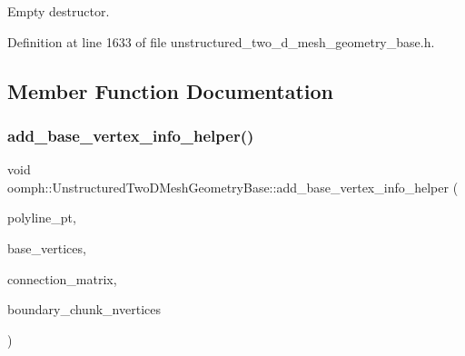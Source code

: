 Empty destructor. 



Definition at line 1633 of file unstructured\+\_\+two\+\_\+d\+\_\+mesh\+\_\+geometry\+\_\+base.\+h.



\subsection{Member Function Documentation}
\mbox{\label{classoomph_1_1UnstructuredTwoDMeshGeometryBase_af23ca325fcc70af06e9fad71fc284b29}} 
\subsubsection{\texorpdfstring{add\+\_\+base\+\_\+vertex\+\_\+info\+\_\+helper()}{add\_base\_vertex\_info\_helper()}}
{\footnotesize\ttfamily void oomph\+::\+Unstructured\+Two\+D\+Mesh\+Geometry\+Base\+::add\+\_\+base\+\_\+vertex\+\_\+info\+\_\+helper (\begin{DoxyParamCaption}\item[{\hyperlink{classoomph_1_1TriangleMeshPolyLine}{Triangle\+Mesh\+Poly\+Line} $\ast$}]{polyline\+\_\+pt,  }\item[{std\+::map$<$ unsigned, std\+::map$<$ unsigned, \hyperlink{classoomph_1_1Vector}{Vector}$<$ \hyperlink{structoomph_1_1UnstructuredTwoDMeshGeometryBase_1_1base__vertex__info}{base\+\_\+vertex\+\_\+info} $>$ $>$ $>$ \&}]{base\+\_\+vertices,  }\item[{std\+::map$<$ unsigned, std\+::map$<$ unsigned, \hyperlink{classoomph_1_1Vector}{Vector}$<$ \hyperlink{structoomph_1_1UnstructuredTwoDMeshGeometryBase_1_1vertex__connection__info}{vertex\+\_\+connection\+\_\+info} $>$ $>$ $>$ \&}]{connection\+\_\+matrix,  }\item[{std\+::map$<$ unsigned, std\+::map$<$ unsigned, unsigned $>$ $>$ \&}]{boundary\+\_\+chunk\+\_\+nvertices }\end{DoxyParamCaption})\hspace{0.3cm}{\ttfamily [protected]}}



